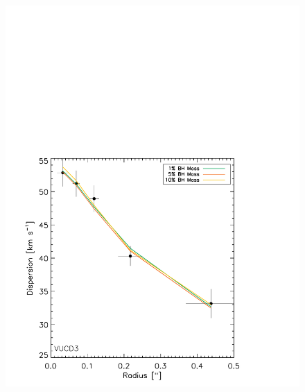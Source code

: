 \documentclass{aastex}
\begin{document}
\begin{figure}[ht!]
  \centering
  \begin{minipage}{0.48\textwidth}
    \includegraphics[trim={0 0 0 10cm},clip,scale=0.5]{vucd3_onedanisotropy.pdf}%
  \end{minipage}
  \begin{minipage}{0.48\textwidth}

\end{minipage}
\end{figure}
\end{document}
